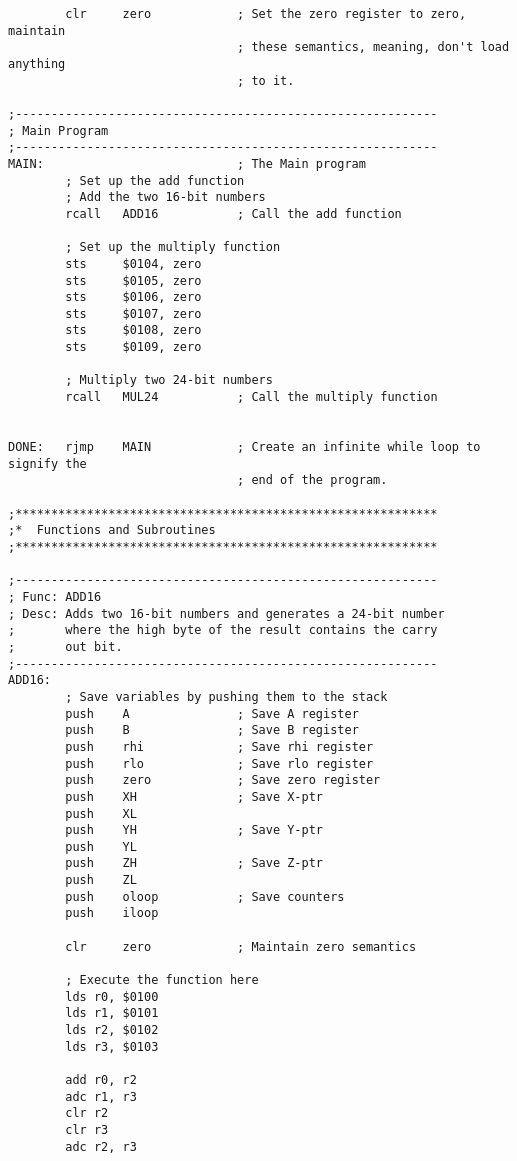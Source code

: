\documentclass[12pt,letterpaper]{article}
\begin{document}
\begin{verbatim}
        clr     zero            ; Set the zero register to zero, maintain
                                ; these semantics, meaning, don't load anything
                                ; to it.

;-----------------------------------------------------------
; Main Program
;-----------------------------------------------------------
MAIN:                           ; The Main program
        ; Set up the add function
        ; Add the two 16-bit numbers
        rcall   ADD16           ; Call the add function

        ; Set up the multiply function
        sts     $0104, zero
        sts     $0105, zero
        sts     $0106, zero
        sts     $0107, zero
        sts     $0108, zero
        sts     $0109, zero

        ; Multiply two 24-bit numbers
        rcall   MUL24           ; Call the multiply function


DONE:   rjmp    MAIN            ; Create an infinite while loop to signify the 
                                ; end of the program.

;***********************************************************
;*  Functions and Subroutines
;***********************************************************

;-----------------------------------------------------------
; Func: ADD16
; Desc: Adds two 16-bit numbers and generates a 24-bit number
;       where the high byte of the result contains the carry
;       out bit.
;-----------------------------------------------------------
ADD16:
        ; Save variables by pushing them to the stack
        push    A               ; Save A register
        push    B               ; Save B register
        push    rhi             ; Save rhi register
        push    rlo             ; Save rlo register
        push    zero            ; Save zero register
        push    XH              ; Save X-ptr
        push    XL
        push    YH              ; Save Y-ptr
        push    YL              
        push    ZH              ; Save Z-ptr
        push    ZL
        push    oloop           ; Save counters
        push    iloop               

        clr     zero            ; Maintain zero semantics

        ; Execute the function here
        lds r0, $0100
        lds r1, $0101
        lds r2, $0102
        lds r3, $0103

        add r0, r2
        adc r1, r3
        clr r2
        clr r3
        adc r2, r3


\end{verbatim}
\end{document}
